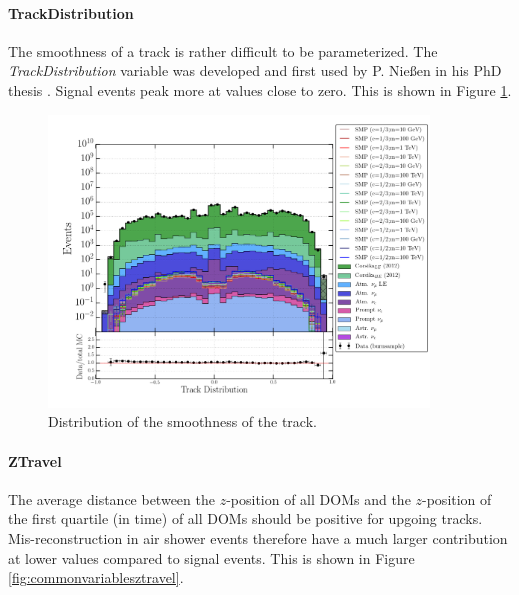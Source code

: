 \paragraph{TrackDistribution}
The smoothness of a track is rather difficult to be parameterized. The \textit{TrackDistribution} variable was developed and first used by P. Nie{\ss}en in his PhD thesis \cite{Niessen2001Search}. Signal events peak more at values close to zero. This is shown in Figure \ref{fig:commonvariablestrackdistr}.

\begin{figure}
\centering
\includegraphics[width = 0.9\textwidth]{chapter8/img/1D_stack_trackdistribution_50.png}
\caption{Distribution of the smoothness of the track.}
\label{fig:commonvariablestrackdistr}
\end{figure}

\paragraph{ZTravel}
The average distance between the $z$-position of all DOMs and the $z$-position of the first quartile (in time) of all DOMs should be positive for upgoing tracks. Mis-reconstruction in air shower events therefore have a much larger contribution at lower values compared to signal events. This is shown in Figure \ref{fig:commonvariablesztravel}.

